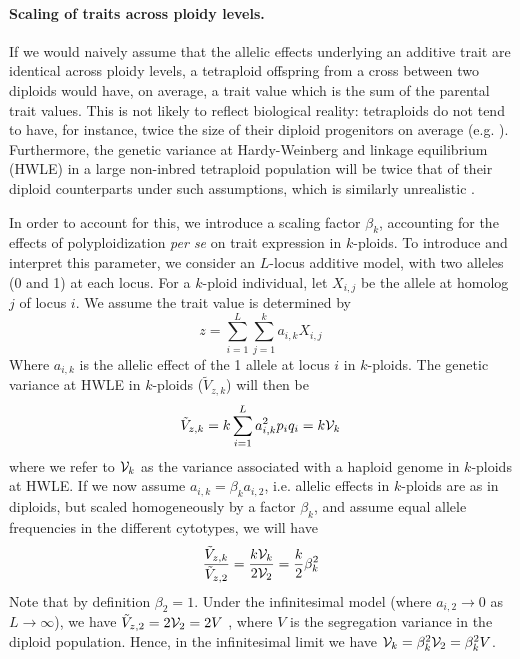 \documentclass[12pt,a4paper]{article}
\begin{document}
    \paragraph{Scaling of traits across ploidy levels.}

    If we would naively assume that the allelic effects underlying an additive
    trait are identical across ploidy levels, 
    a tetraploid offspring from a cross between two diploids would have, on average,
    a trait value which is the sum of the parental trait values.
    This is not likely to reflect biological reality: tetraploids do not tend to
    have, for instance, twice the size of their diploid progenitors on average
    (e.g. \cite{porturas2019}).
    Furthermore, the genetic variance at Hardy-Weinberg and linkage equilibrium
    (HWLE) in a large non-inbred tetraploid population will be twice that of their
    diploid counterparts under such assumptions, which is similarly unrealistic
    \citep{clo2022}.

    In order to account for this, we introduce a scaling factor $\beta_k$,
    accounting for the effects of polyploidization \textit{per se} on trait
    expression in $k$-ploids.
    To introduce and interpret this parameter, we consider an $L$-locus additive
    model, with two alleles (0 and 1) at each locus.
    For a $k$-ploid individual, let $X_{i,j}$ be the allele at homolog $j$ of locus
    $i$.
    We assume the trait value is determined by
    \begin{equation}
      z = \sum_{i=1}^L\sum_{j=1}^k a_{i,k} X_{i,j}
    \end{equation}
    Where $a_{i,k}$ is the allelic effect of the 1 allele at locus $i$ in
    $k$-ploids.
    The genetic variance at HWLE in $k$-ploids ($\tilde{V}_{z,k}$) will then be
    \begin{equation}
      \tilde{V}_{z,k} = k\sum_{i=1}^L a_{i,k}^2 p_iq_i = k\mathcal{V}_{k}
    \end{equation}
    where we refer to $\mathcal{V}_{k}$ as the variance associated with a haploid genome in
    $k$-ploids at HWLE.
    If we now assume $a_{i,k} = \beta_k a_{i,2}$, i.e. allelic effects in $k$-ploids
    are as in diploids, but scaled homogeneously by a factor $\beta_k$, and assume
    equal allele frequencies in the different cytotypes, we will have
    \begin{equation}
      \frac{\tilde{V}_{z,k}}{\tilde{V}_{z,2}} 
      = \frac{k\mathcal{V}_{k}}{2\mathcal{V}_{2}} = \frac{k}{2} \beta_{k}^2
    \end{equation}
    Note that by definition $\beta_2=1$.
    Under the infinitesimal model (where $a_{i,2} \rightarrow 0$ as $L\rightarrow
    \infty$), we have $\tilde{V}_{z,2} = 2\mathcal{V}_{2} = 2V$ \citep{barton2017}, where
    $V$ is the segregation variance in the diploid population.
    Hence, in the infinitesimal limit we have $\mathcal{V}_{k} = \beta_k^2 \mathcal{V}_{2} =
    \beta_k^2 V$.
\end{document}
